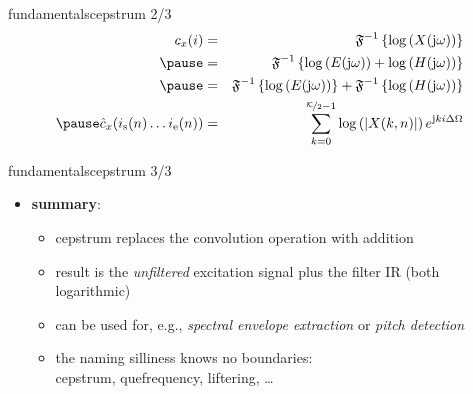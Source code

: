 		\begin{frame}{fundamentals}{cepstrum 2/3}
			\vspace{-4mm}
            \begin{eqnarray*}
				c_x(i)	&=& \mathfrak{F}^{-1}\left\{\log\left(X(\jom)\right)\right\}\nonumber\\
                        \pause
						&=& \mathfrak{F}^{-1}\left\{\log\left(E(\jom)\right) + \log\left(H(\jom)\right)\right\}\nonumber\\
						\pause
                        &=& \mathfrak{F}^{-1}\left\{\log\left(E(\jom)\right)\right\} + \mathfrak{F}^{-1}\left\{\log\left(H(\jom)\right)\right\} \\
                    \pause
					\hat{c}_x(i_{\mathrm{s}}(n)\ldots i_{\mathrm{e}}(n)) &=& \sum\limits_{k=0}^{\nicefrac{\mathcal{K}}{2}-1}{\log\left(|X(k,n)|\right)\e^{\mathrm{j}ki\Delta\Omega}} 
			\end{eqnarray*}
				
			\vspace{-4mm}
		\end{frame}
        
        \begin{frame}{fundamentals}{cepstrum 3/3}
            \begin{itemize}
                \item \textbf{summary}:
                    \begin{itemize}
                        \item   cepstrum replaces the convolution operation with addition
                        \item   result is the \textit{unfiltered} excitation signal plus the filter IR (both logarithmic)
                        \item   can be used for, e.g., \textit{spectral envelope extraction} or \textit{pitch detection}
                        \item<2> the naming silliness knows no boundaries:\\
                         cepstrum, quefrequency, liftering, \ldots
                    \end{itemize}
            \end{itemize}
        \end{frame}

